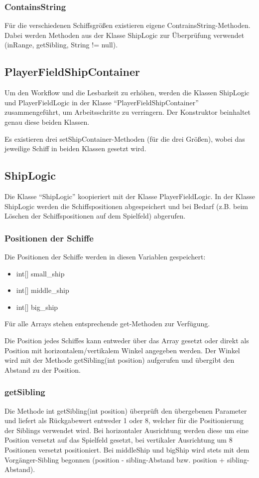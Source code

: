 \documentclass[11pt]{article} %
\begin{document}
\subsubsection{ContainsString}
Für die verschiedenen Schiffsgrößen existieren eigene ContrainsString-Methoden. Dabei werden Methoden aus der Klasse ShipLogic zur Überprüfung verwendet (inRange, getSibling, String != null).

\subsection{PlayerFieldShipContainer}
Um den Workflow und die Lesbarkeit zu erhöhen, werden die Klassen ShipLogic und PlayerFieldLogic in der Klasse \enquote{PlayerFieldShipContainer} zusammengeführt, um Arbeitsschritte zu verringern. Der Konstruktor beinhaltet genau diese beiden Klassen.

Es existieren drei setShipContainer-Methoden (für die drei Größen), wobei das jeweilige Schiff in beiden Klassen gesetzt wird.

\subsection{ShipLogic}
Die Klasse \enquote{ShipLogic} koopieriert mit der Klasse PlayerFieldLogic. In der Klasse ShipLogic werden die Schiffspositionen abgespeichert und bei Bedarf (z.B. beim Löschen der Schiffspositionen auf dem Spielfeld) abgerufen.

\subsubsection{Positionen der Schiffe}
Die Positionen der Schiffe werden in diesen Variablen gespeichert:
\begin{itemize}
\item int[] small\_ship
\item int[] middle\_ship
\item int[] big\_ship
\end{itemize}

Für alle Arrays stehen entsprechende get-Methoden zur Verfügung.

Die Position jedes Schiffes kann entweder über das Array gesetzt oder direkt als Position mit horizontalem/vertikalem Winkel angegeben werden. Der Winkel wird mit der Methode getSibling(int position) aufgerufen und übergibt den Abstand zu der Position.

\subsubsection{getSibling}
Die Methode int getSibling(int position) überprüft den übergebenen Parameter und liefert als Rückgabewert entweder 1 oder 8, welcher für die Positionierung der Siblings verwendet wird. Bei horizontaler Ausrichtung werden diese um eine Position versetzt auf das Spielfeld gesetzt, bei vertikaler Ausrichtung um 8 Positionen versetzt positioniert. Bei middleShip und bigShip wird stets mit dem Vorgänger-Sibling begonnen (position - sibling-Abstand bzw. position + sibling-Abstand).
\end{document}
